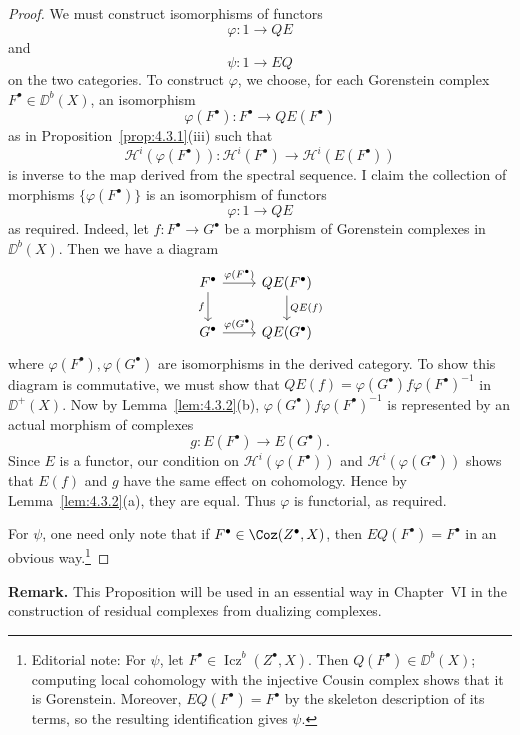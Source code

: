 \begin{proof}
We must construct isomorphisms of functors
\[
\varphi\colon 1\longrightarrow QE
\]
and
\[
\psi\colon 1\longrightarrow EQ
\]
on the two categories. To construct $\varphi$, we choose, for each Gorenstein complex $F^\bullet\in\DD^b(X)$, an isomorphism
\[
\varphi(F^\bullet)\colon F^\bullet\longrightarrow QE(F^\bullet)
\]
as in Proposition~\ref{prop:4.3.1}(iii) such that
\[
\mathcal{H}^{i}(\varphi(F^\bullet))\colon \mathcal{H}^{i}(F^\bullet)\longrightarrow \mathcal{H}^{i}(E(F^\bullet))
\]
is inverse to the map derived from the spectral sequence. I claim the collection of morphisms $\{\varphi(F^\bullet)\}$ is an isomorphism of functors
\[
\varphi\colon 1\longrightarrow QE
\]
as required. Indeed, let $f\colon F^\bullet\to G^\bullet$ be a morphism of Gorenstein complexes in $\DD^b(X)$. Then we have a diagram
\[
\begin{tikzcd}
F^\bullet \arrow[r, "\varphi(F^\bullet)"] \arrow[d, "f"'] & QE(F^\bullet) \arrow[d, "QE(f)"] \\
G^\bullet \arrow[r, "\varphi(G^\bullet)"] & QE(G^\bullet)
\end{tikzcd}
\]
where $\varphi(F^\bullet),\varphi(G^\bullet)$ are isomorphisms in the derived category. To show this diagram is commutative, we must show that $QE(f)=\varphi(G^\bullet)f\varphi(F^\bullet)^{-1}$ in $\DD^+(X)$. Now by Lemma~\ref{lem:4.3.2}(b), $\varphi(G^\bullet)f\varphi(F^\bullet)^{-1}$ is represented by an actual morphism of complexes
\[
g\colon E(F^\bullet)\longrightarrow E(G^\bullet).
\]
Since $E$ is a functor, our condition on $\mathcal{H}^{i}(\varphi(F^\bullet))$ and $\mathcal{H}^{i}(\varphi(G^\bullet))$ shows that $E(f)$ and $g$ have the same effect on cohomology. Hence by Lemma~\ref{lem:4.3.2}(a), they are equal. Thus $\varphi$ is functorial, as required.

For $\psi$, one need only note that if $F^\bullet\in\Coz(Z^\bullet,X)$, then $EQ(F^\bullet)=F^\bullet$ in an obvious way.\footnote{Editorial note: For $\psi$, let $F^\bullet\in\operatorname{Icz}^{b}(Z^\bullet,X)$. Then $Q(F^\bullet)\in\DD^b(X)$; computing local cohomology with the injective Cousin complex shows that it is Gorenstein. Moreover, $EQ(F^\bullet)=F^\bullet$ by the skeleton description of its terms, so the resulting identification gives $\psi$.}

\end{proof}

\par\medskip\noindent\textbf{Remark.}
This Proposition will be used in an essential way in Chapter~VI in the construction of residual complexes from dualizing complexes.
\par\medskip
\par
\endgroup
